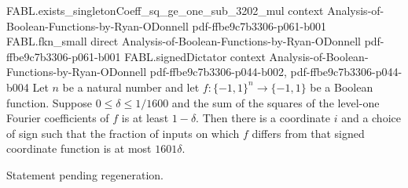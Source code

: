\begin{theorem}
\proofstep
  {FABL.exists_singletonCoeff_sq_ge_one_sub_3202_mul}
  {context}
  {Analysis-of-Boolean-Functions-by-Ryan-ODonnell}
  {pdf-ffbe9c7b3306-p061-b001}
\proofstep
  {FABL.fkn_small}
  {direct}
  {Analysis-of-Boolean-Functions-by-Ryan-ODonnell}
  {pdf-ffbe9c7b3306-p061-b001}
\proofstep
  {FABL.signedDictator}
  {context}
  {Analysis-of-Boolean-Functions-by-Ryan-ODonnell}
  {pdf-ffbe9c7b3306-p044-b002,
    pdf-ffbe9c7b3306-p044-b004}
Let $n$ be a natural number and let $f:\{-1,1\}^n\to\{-1,1\}$ be a Boolean function.
Suppose $0\leq\delta\leq 1/1600$ and the sum of the squares of the level-one Fourier
coefficients of $f$ is at least $1-\delta$. Then there is a coordinate $i$ and a choice
of sign such that the fraction of inputs on which $f$ differs from that signed
coordinate function is at most $1601\delta$.
\end{theorem}

\begin{theorem}
\label{FABL.fkn_family_isBigO}
\leanok
{}
Statement pending regeneration.
\end{theorem}
